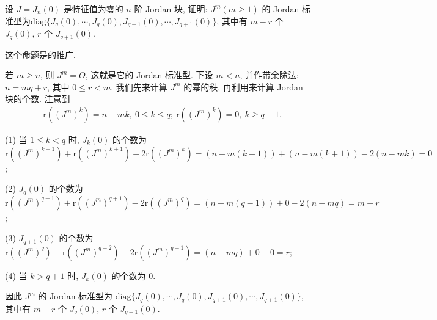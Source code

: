 \documentclass[../../main.tex]{subfiles}
\begin{document}
\begin{proposition}\label{proposition:J_n(0)的Jordan标准型的推广}
设 $J = J_n(0)$ 是特征值为零的 $n$ 阶 Jordan 块, 证明: $J^m (m \geqslant  1)$ 的 Jordan 标准型为$\mathrm{diag}\{J_q(0),\cdots,J_q(0),J_{q + 1}(0),\cdots,J_{q + 1}(0)\}$, 其中有 $m - r$ 个 $J_q(0)$, $r$ 个 $J_{q + 1}(0)$. 
\end{proposition}
\begin{remark}
这个命题是的推广.
\end{remark}
\begin{solution}
若 $m \geqslant  n$, 则 $J^m = O$, 这就是它的 Jordan 标准型. 下设 $m < n$, 并作带余除法: $n = mq + r$, 其中 $0 \leqslant  r < m$. 我们先来计算 $J^m$ 的幂的秩, 再利用来计算 Jordan 块的个数. 注意到
\begin{align*}
&\mathrm{r}((J^m)^k) = n - mk, \ 0 \leqslant  k \leqslant  q; \ 
\mathrm{r}((J^m)^k) = 0, \ k \geqslant  q + 1.
\end{align*}

(1) 当 $1 \leqslant  k < q$ 时, $J_k(0)$ 的个数为 $\mathrm{r}((J^m)^{k - 1}) + \mathrm{r}((J^m)^{k + 1}) - 2\mathrm{r}((J^m)^k) = (n - m(k - 1)) + (n - m(k + 1)) - 2(n - mk) = 0$;

(2) $J_q(0)$ 的个数为 $\mathrm{r}((J^m)^{q - 1}) + \mathrm{r}((J^m)^{q + 1}) - 2\mathrm{r}((J^m)^q) = (n - m(q - 1)) + 0 - 2(n - mq) = m - r$;

(3) $J_{q + 1}(0)$ 的个数为 $\mathrm{r}((J^m)^q) + \mathrm{r}((J^m)^{q + 2}) - 2\mathrm{r}((J^m)^{q + 1}) = (n - mq) + 0 - 0 = r$;

(4) 当 $k > q + 1$ 时, $J_k(0)$ 的个数为 $0$.

因此 $J^m$ 的 Jordan 标准型为 $\mathrm{diag}\{J_q(0),\cdots,J_q(0),J_{q + 1}(0),\cdots,J_{q + 1}(0)\}$, 其中有 $m - r$ 个 $J_q(0)$, $r$ 个 $J_{q + 1}(0)$. 
\end{solution}
\end{document}
